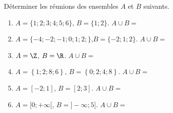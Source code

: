 
Déterminer les réunions des ensembles $A$ et $B$ suivants. 
\begin{enumerate}
\item $A = \lbrace 1;2;3;4;5;6\rbrace$, $B = \lbrace 1;2 \rbrace$. $A \cup B = $
\item $A = \lbrace -4;-2;-1;0;1;2;\rbrace$,$B = \lbrace -2;1;2 \rbrace$.  $A \cup B = $
\item $A=\Z$, $B =\R$. $A \cup B = $ 
\item $A=\left\lbrace 1;2;8;6  \right\rbrace $, $B =\left\lbrace 0;2;4;8  \right\rbrace $. $A \cup B = $ 
\item $A=[-2;1]$, $B =[2;3]$. $A \cup B = $ 
\item $A=[0;+\infty[$, $B =]-\infty;5]$. $A \cup B = $ 
\end{enumerate}